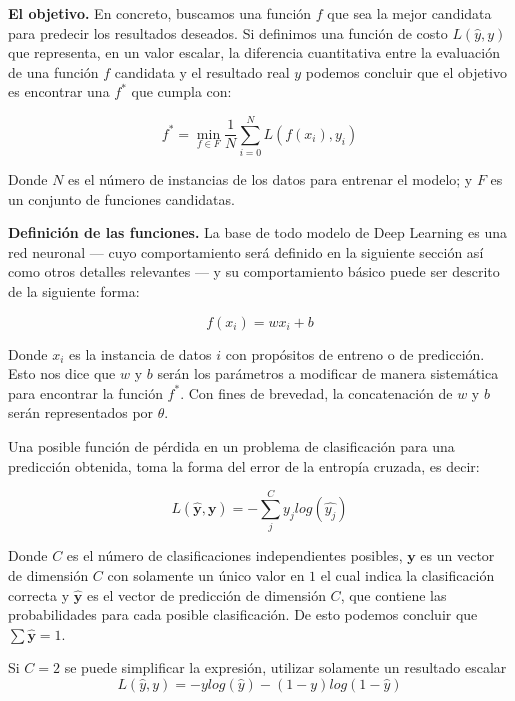 \textbf{El objetivo.} En concreto, buscamos una función $f$ que sea la mejor candidata para predecir los resultados deseados. Si definimos una función de costo $L(\hat{y}, y)$ que representa, en un valor escalar, la diferencia cuantitativa entre la evaluación de una función $f$ candidata y el resultado real $y$ podemos concluir que el objetivo es encontrar una $f^*$ que cumpla con:

\[ f^* = \min_{f \in F} \frac{1}{N} \sum_{i = 0}^{N} L(f(x_i), y_i) \]

Donde $N$ es el número de instancias de los datos para entrenar el modelo; y $F$ es un conjunto de funciones candidatas.

\textbf{Definición de las funciones.} La base de todo modelo de Deep Learning es una red neuronal --- cuyo comportamiento será definido en la siguiente sección así como otros detalles relevantes --- y su comportamiento básico puede ser descrito de la siguiente forma:

\[ f(x_i) = w x_i + b \]

Donde $x_i$ es la instancia de datos $i$ con propósitos de entreno o de predicción. Esto nos dice que $w$ y $b$ serán los parámetros a modificar de manera sistemática para encontrar la función $f^*$. Con fines de brevedad, la concatenación de $w$ y $b$ serán representados por $\theta$.

Una posible función de pérdida en un problema de clasificación para una predicción obtenida, toma la forma del error de la entropía cruzada, es decir:

\begin{equation}
\label{eq:crossentropy}
L(\mathbf{\hat{y}}, \mathbf{y}) = - \sum_{j}^{C} y_j log \left( \hat{y_j} \right)
\end{equation}

Donde $C$ es el número de clasificaciones independientes posibles, $\mathbf{y}$ es un vector de dimensión $C$ con solamente un único valor en $1$ el cual indica la clasificación correcta y $\mathbf{\hat{y}}$ es el vector de predicción de dimensión $C$, que contiene las probabilidades para cada posible clasificación. De esto podemos concluir que $\sum \mathbf{\hat{y}} = 1$.

Si $C = 2$ se puede simplificar la expresión, utilizar solamente un resultado escalar
\begin{equation}
\label{eq:bincrossentropy}
L(\hat{y}, y) = - y log \left( \hat{y} \right) - \left(1 - y\right) log \left( 1 - \hat{y} \right)
\end{equation}

